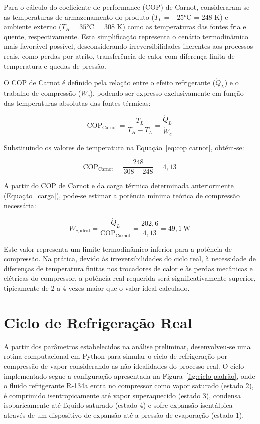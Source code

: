 Para o cálculo do coeficiente de performance (COP) de Carnot, consideraram-se as temperaturas de armazenamento do produto ($T_L = -25$°C = 248 K) e ambiente externo ($T_H = 35$°C = 308 K) como as temperaturas das fontes fria e quente, respectivamente. Esta simplificação representa o cenário termodinâmico mais favorável possível, desconsiderando irreversibilidades inerentes aos processos reais, como perdas por atrito, transferência de calor com diferença finita de temperatura e quedas de pressão.

O COP de Carnot é definido pela relação entre o efeito refrigerante ($\dot{Q}_L$) e o trabalho de compressão ($\dot{W}_c$), podendo ser expresso exclusivamente em função das temperaturas absolutas das fontes térmicas:

\begin{equation}
    \text{COP}_{\text{Carnot}} = \frac{T_L}{T_H - T_L} = \frac{\dot{Q}_L}{\dot{W}_c}
    \label{eq:cop carnot}
\end{equation}

Substituindo os valores de temperatura na Equação~\ref{eq:cop carnot}, obtém-se:

\begin{equation}
    \text{COP}_{\text{Carnot}} = \frac{248}{308 - 248} = 4,13
\end{equation}

A partir do COP de Carnot e da carga térmica determinada anteriormente (Equação~\ref{carga}), pode-se estimar a potência mínima teórica de compressão necessária:

\begin{equation}
    \dot{W}_{c,\text{ideal}} = \frac{\dot{Q}_L}{\text{COP}_{\text{Carnot}}} = \frac{202,6}{4,13} = 49,1~\text{W}
    \label{eq:potencia ideal}
\end{equation}

Este valor representa um limite termodinâmico inferior para a potência de compressão. Na prática, devido às irreversibilidades do ciclo real, à necessidade de diferenças de temperatura finitas nos trocadores de calor e às perdas mecânicas e elétricas do compressor, a potência real requerida será significativamente superior, tipicamente de 2 a 4 vezes maior que o valor ideal calculado.

\section{Ciclo de Refrigeração Real}

A partir dos parâmetros estabelecidos na análise preliminar, desenvolveu-se uma rotina computacional em Python para simular o ciclo de refrigeração por compressão de vapor considerando as não idealidades do processo real. O ciclo implementado segue a configuração apresentada na Figura~\ref{fig:ciclo padrão}, onde o fluido refrigerante R-134a entra no compressor como vapor saturado (estado 2), é comprimido isentropicamente até vapor superaquecido (estado 3), condensa isobaricamente até líquido saturado (estado 4) e sofre expansão isentálpica através de um dispositivo de expansão até a pressão de evaporação (estado 1).

